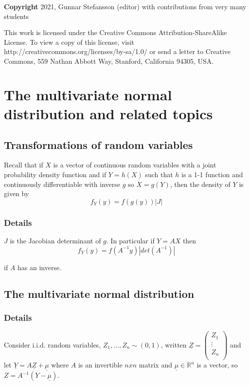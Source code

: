 \documentclass[12pt,a4paper]{article}
\theoremstyle{regla}
\theoremstyle{remark}
\theoremstyle{definition}
\theoremstyle{nonumberbreak}
\begin{document}
{\bf Copyright}
2021, Gunnar Stefansson (editor) with contributions from very many students

This work is licensed under the Creative Commons
Attribution-ShareAlike License. To view a copy of this license, visit
http://creativecommons.org/licenses/by-sa/1.0/ or send a letter to
Creative Commons, 559 Nathan Abbott Way, Stanford, California 94305,
USA.
\clearpage
\section{The multivariate normal distribution and related topics}
\subsection{Transformations of random variables}
\begin{fbox}
\begin{minipage}{0.97\textwidth}
Recall that if $X$ is a vector of continuous random variables with a joint probability density function and if $Y=h(X)$ such that $h$ is a 1-1 function and continuously differentiable with inverse $g$ so $X= g(Y)$, then the density of $Y$ is given by 
$$ f_Y(y)=f(g(y))|J|$$
\end{minipage}
\end{fbox}
\subsubsection{Details}
$J$ is the Jacobian determinant of $g$. In particular if $Y=AX$ then 
$$ f_Y(y)=f(A^{-1}y)|det(A^{-1})|$$

if $A$ has an inverse.

\subsection{The multivariate normal distribution}
\subsubsection{Details}
Consider i.i.d. random variables, $Z_1, \ldots ,Z_n \sim (0,1)$, written $\underline{Z}=\left( \begin{array}{ccc}
   Z_1 \\
  \vdots\\
  Z_n\\
 \end{array} \right)$ and let $\underline{Y}=A \underline{Z} + \underline{\mu}$ where $A$ is an invertible $n x n$ matrix and $\underline{\mu} \in \mathbb{R}^n$ is a vector, so $ Z= A^{-1}(Y-\underline{\mu})$.\\
\end{document}
